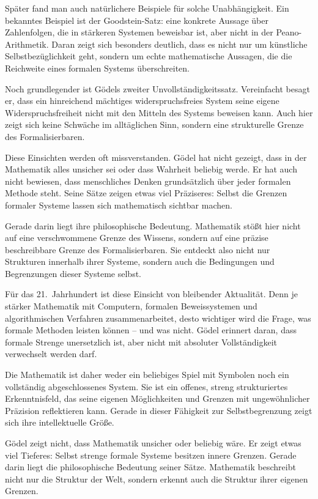Später fand man auch natürlichere Beispiele für solche Unabhängigkeit. Ein bekanntes Beispiel ist der Goodstein-Satz: eine konkrete Aussage über Zahlenfolgen, die in stärkeren Systemen beweisbar ist, aber nicht in der Peano-Arithmetik. Daran zeigt sich besonders deutlich, dass es nicht nur um künstliche Selbstbezüglichkeit geht, sondern um echte mathematische Aussagen, die die Reichweite eines formalen Systems überschreiten.

Noch grundlegender ist Gödels zweiter Unvollständigkeitssatz. Vereinfacht besagt er, dass ein hinreichend mächtiges widerspruchsfreies System seine eigene Widerspruchsfreiheit nicht mit den Mitteln des Systems beweisen kann. Auch hier zeigt sich keine Schwäche im alltäglichen Sinn, sondern eine strukturelle Grenze des Formalisierbaren.

Diese Einsichten werden oft missverstanden. Gödel hat nicht gezeigt, dass in der Mathematik \glqq alles unsicher\grqq{} sei oder dass Wahrheit beliebig werde. Er hat auch nicht bewiesen, dass menschliches Denken grundsätzlich über jeder formalen Methode steht. Seine Sätze zeigen etwas viel Präziseres: Selbst die Grenzen formaler Systeme lassen sich mathematisch sichtbar machen.

Gerade darin liegt ihre philosophische Bedeutung. Mathematik stößt hier nicht auf eine verschwommene Grenze des Wissens, sondern auf eine präzise beschreibbare Grenze des Formalisierbaren. Sie entdeckt also nicht nur Strukturen innerhalb ihrer Systeme, sondern auch die Bedingungen und Begrenzungen dieser Systeme selbst.

Für das 21.~Jahrhundert ist diese Einsicht von bleibender Aktualität. Denn je stärker Mathematik mit Computern, formalen Beweissystemen und algorithmischen Verfahren zusammenarbeitet, desto wichtiger wird die Frage, was formale Methoden leisten können -- und was nicht. Gödel erinnert daran, dass formale Strenge unersetzlich ist, aber nicht mit absoluter Vollständigkeit verwechselt werden darf.

Die Mathematik ist daher weder ein beliebiges Spiel mit Symbolen noch ein vollständig abgeschlossenes System. Sie ist ein offenes, streng strukturiertes Erkenntnisfeld, das seine eigenen Möglichkeiten und Grenzen mit ungewöhnlicher Präzision reflektieren kann. Gerade in dieser Fähigkeit zur Selbstbegrenzung zeigt sich ihre intellektuelle Größe.

\begin{DidacticBox}
	\label{box:goedel-pointe}
	Gödel zeigt nicht, dass Mathematik unsicher oder beliebig wäre. Er zeigt etwas viel Tieferes: Selbst strenge formale Systeme besitzen innere Grenzen. Gerade darin liegt die philosophische Bedeutung seiner Sätze. Mathematik beschreibt nicht nur die Struktur der Welt, sondern erkennt auch die Struktur ihrer eigenen Grenzen.
\end{DidacticBox}


